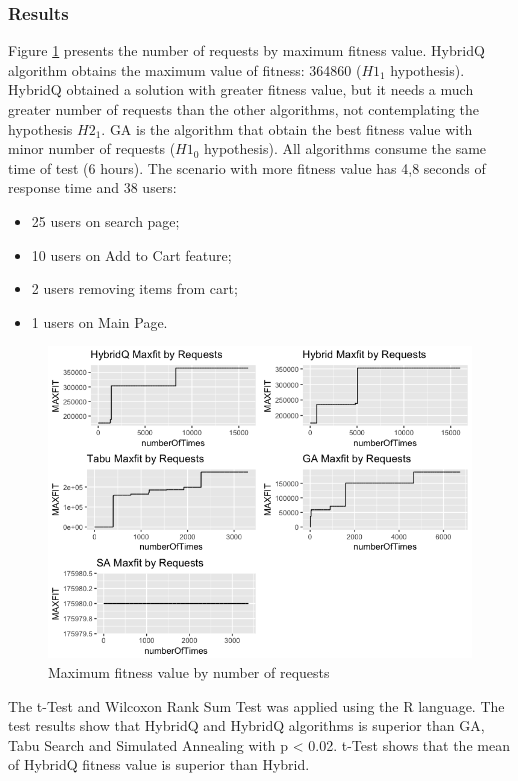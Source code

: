 \documentclass[espaco=umemeio,chapter=TITLE,twoside,openright]{abnt}
\begin{document}
\subsubsection{Results}

Figure \ref{fig:experiment1} presents the number of requests by maximum fitness value. HybridQ algorithm obtains the maximum value of fitness: 364860 ($H1_{1}$ hypothesis).  HybridQ obtained a solution with greater fitness value, but it needs a much greater number of requests than the other algorithms, not contemplating the hypothesis $H2_{1}$. GA is the algorithm that obtain the best fitness value with minor number of requests ($H1_{0}$ hypothesis). All algorithms consume the same time of test (6 hours). The scenario with more fitness value has 4,8 seconds of response time and 38 users:

\begin{itemize}
\item 25 users on search page;
\item 10 users on Add to Cart feature;
\item 2 users removing items from cart;
\item 1 users on Main Page. 
\end{itemize}

\begin{figure}[h]
\centering
\includegraphics[width=1\textwidth]{./images/experiment1.png}
\caption{Maximum fitness value by number of requests}
\label{fig:experiment1}
\end{figure}


The t-Test and Wilcoxon Rank Sum Test was applied using the R language. The test results show that HybridQ and HybridQ algorithms is superior than GA, Tabu Search and Simulated Annealing with p < 0.02. t-Test shows that the mean of HybridQ fitness value is superior than Hybrid.
\end{document}
